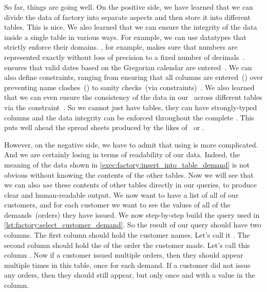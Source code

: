 %
%
%
So far, things are going well.
On the positive side, we have learned that we can divide the data of factory into separate aspects and then store it into different tables.
This is nice.
We also learned that we can ensure the integrity of the data inside a single table in various ways.
For example, we can use datatypes that strictly enforce their domains.
, for example, makes sure that numbers are represented exactly without loss of precision to a fixed number of decimals~\cite{PGDG:PD:NT}.
 ensures that valid dates based on the Gregorian calendar are entered~\cite{PGDG:PD:HU,G1582IG}.
We can also define constraints, ranging from ensuring that all columns are entered~() over preventing name clashes~() to sanity checks~(via  constraints)~\cite{PGDG:PD:C}.
We also learned that we can even ensure the consistency of the data in our \db\ across different tables via the  constraint~\cite{PGDG:PD:FK}.
So we cannot just have tables, they can have strongly-typed columns and the data integrity can be enforced throughout the complete \db.
This puts  well ahead the spread sheets produced by the likes of \microsoftExcel\ or \libreofficeCalc.

However, on the negative side, we have to admit that using  is more complicated.
And we are certainly losing in terms of readability of our data.
Indeed, the meaning of the  data shown in \cref{exec:factory:insert_into_table_demand} is not obvious without knowing the contents of the other tables.
Now we will see that we can also \emph{use} these contents of other tables directly in our queries, to produce clear and human-readable output.%
%
%
%
%
We now want to have a list of all of our customers, and for each customer we want to see the  values of all of the demands~(orders) they have issued.
We now step-by-step build the query used in \cref{lst:factory:select_customer_demand}.
So the result of our query should have two columns.
The first column should hold the customer names.
Let's call it .
The second column should hold the  of the order the customer made.
Let's call this column .
Now if a customer issued multiple orders, then they should appear multiple times in this table, once for each demand.
If a customer did not issue any orders, then they should still appear, but only once and with a  value in the  column.

